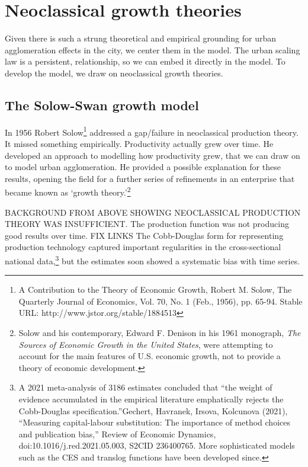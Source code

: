 \section{Neoclassical growth theories}  \label{section-growth}
Given there is such a strung theoretical and empirical grounding for urban agglomeration effects in the city, we center them in the model.  The urban scaling law is a persistent, relationship, so we can embed it directly in the model. To develop the model, we draw on neoclassical growth theories.

\subsection{The Solow-Swan growth model}
In 1956 Robert Solow\footnote{A Contribution to the Theory of Economic Growth,  Robert M. Solow, The Quarterly Journal of Economics, Vol. 70, No. 1 (Feb., 1956), pp. 65-94. Stable URL: http://www.jstor.org/stable/1884513} 
addressed a gap/failure in  neoclassical production theory. It missed something empirically. Productivity actually grew over time.  
He developed an approach to modelling how productivity grew, that we can draw on to model urban agglomeration.  %
He provided a possible explanation for these results, opening the field for a further series of refinements in an enterprise that became known as `growth theory.'\footnote{Solow and his contemporary, Edward F. Denison in his 1961 monograph, \textit{The Sources of Economic Growth in the United States}, were attempting to account for the main features of U.S. economic growth, not to provide a theory of economic development.}%

BACKGROUND FROM ABOVE SHOWING NEOCLASSICAL PRODUCTION THEORY WAS INSUFFICIENT. The production function was not producing good results over time. FIX LINKS
The \gls{Cobb-Douglas} form for representing production technology captured  important regularities in the cross-sectional national data,\footnote{ A 2021 meta-analysis of 3186 estimates concluded that ``the weight of evidence accumulated in the empirical literature emphatically rejects the Cobb-Douglas specification.''Gechert, Havranek, Irsova, Kolcunova (2021), ``Measuring capital-labour substitution: The importance of method choices and publication bias,'' Review of Economic Dynamics, doi:10.1016/j.red.2021.05.003, S2CID 236400765. More sophisticated models  such as the CES and translog functions have been developed since.} 
but the estimates soon showed a systematic bias with time series. 

